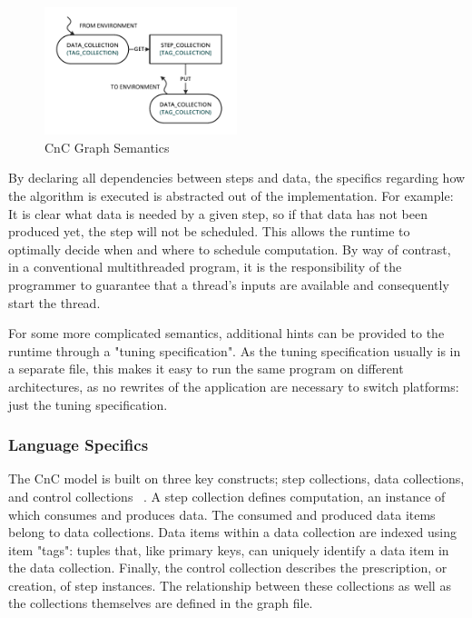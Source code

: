 \begin{figure}[t]
  \centering
  \includegraphics[width=0.5\textwidth]{drawings/CnCExample.pdf}
  \caption{CnC Graph Semantics}
  \label{fig:cnc_graph}
\end{figure}

By declaring all dependencies between steps and data, the specifics
regarding how the algorithm is executed is abstracted out of the
implementation. For example: It is clear what data is needed by a
given step, so if that data has not been produced yet, the step will
not be scheduled. This allows the runtime to optimally decide when and
where to schedule computation. By way of contrast, in a conventional
multithreaded program, it is the responsibility of the programmer to
guarantee that a thread's inputs are available and consequently start
the thread.

For some more complicated semantics, additional hints can be provided
to the runtime through a "tuning specification". As the tuning
specification usually is in a separate file, this makes it easy to run
the same program on different architectures, as no rewrites of the
application are necessary to switch platforms: just the tuning
specification.

\subsubsection{Language Specifics}
\label{sec:cnc_language}

The CnC model is built on three key constructs; step collections, data
collections, and control collections ~\cite{budimlicconcurrent}. A
step collection defines computation, an instance of which consumes and
produces data. The consumed and produced data items belong to data
collections. Data items within a data collection are indexed using
item "tags": tuples that, like primary keys, can uniquely identify a
data item in the data collection. Finally, the control collection
describes the prescription, or creation, of step instances. The
relationship between these collections as well as the collections
themselves are defined in the graph file.

